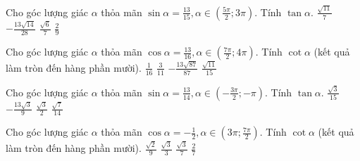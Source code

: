 \documentclass[12pt,a4paper]{article}
\begin{document}
\begin{ex}
 Cho góc lượng giác $\alpha$ thỏa mãn $\sin \alpha=\frac{13}{15}, \alpha \in \left( \frac{5 \pi}{2};3\pi \right)$. Tính $\tan\alpha$. 
\choice
{ $\frac{\sqrt{11}}{7}$ }
   { \True $- \frac{13 \sqrt{14}}{28}$ }
     { $\frac{\sqrt{6}}{7}$ }
    { $\frac{2}{9}$ }
\end{ex}

\begin{ex}
 Cho góc lượng giác $\alpha$ thỏa mãn $\cos \alpha=\frac{13}{16}, \alpha \in \left( \frac{7 \pi}{2}; 4\pi \right)$. Tính $\cot\alpha$ (kết quả làm tròn đến hàng phần mười). 
\choice
{ $\frac{1}{16}$ }
   { $\frac{3}{11}$ }
     { \True $- \frac{13 \sqrt{87}}{87}$ }
    { $\frac{\sqrt{11}}{15}$ }
\end{ex}

\begin{ex}
 Cho góc lượng giác $\alpha$ thỏa mãn $\sin \alpha=\frac{13}{14}, \alpha \in \left( - \frac{3 \pi}{2};- \pi \right)$. Tính $\tan\alpha$. 
\choice
{ $\frac{\sqrt{3}}{15}$ }
   { \True $- \frac{13 \sqrt{3}}{9}$ }
     { $\frac{\sqrt{3}}{2}$ }
    { $\frac{\sqrt{7}}{14}$ }
\end{ex}

\begin{ex}
 Cho góc lượng giác $\alpha$ thỏa mãn $\cos \alpha=- \frac{1}{2}, \alpha \in \left( 3 \pi;\frac{7 \pi}{2} \right)$. Tính $\cot\alpha$ (kết quả làm tròn đến hàng phần mười). 
\choice
{ $\frac{\sqrt{2}}{9}$ }
   { \True $\frac{\sqrt{3}}{3}$ }
     { $\frac{\sqrt{3}}{7}$ }
    { $\frac{2}{7}$ }
\end{ex}
\end{document}
